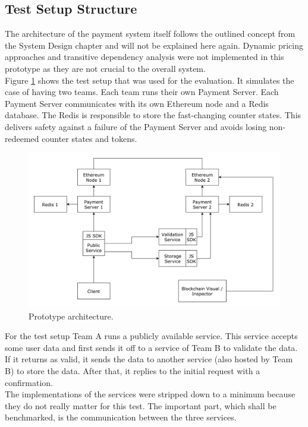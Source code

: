 \documentclass[a4paper,12pt]{scrartcl}
\begin{document}
\subsection{Test Setup Structure}

The architecture of the payment system itself follows the outlined concept from the System Design chapter and will not be explained here again. Dynamic pricing approaches and transitive dependency analysis were not implemented in this prototype as they are not crucial to the overall system.\\

Figure \ref{fig:PrototypeArchitecture} shows the test setup that was used for the evaluation. It simulates the case of having two teams. Each team runs their own Payment Server. Each Payment Server communicates with its own Ethereum node and a Redis database. The Redis is responsible to store the fast-changing counter states. This delivers safety against a failure of the Payment Server and avoids losing non-redeemed counter states and tokens.\\

\begin{figure}[H]
\centering
\includegraphics[width=450pt]{Images/PrototypeArchitecture.pdf}
\caption{Prototype architecture.}
\label{fig:PrototypeArchitecture}
\end{figure}

For the test setup Team A runs a publicly available service. This service accepts some user data and first sends it off to a service of Team B to validate the data. If it returns as valid, it sends the data to another service (also hosted by Team B) to store the data. After that, it replies to the initial request with a confirmation.\\
The implementations of the services were stripped down to a minimum because they do not really matter for this test. The important part, which shall be benchmarked, is the communication between the three services.\\
\end{document}
